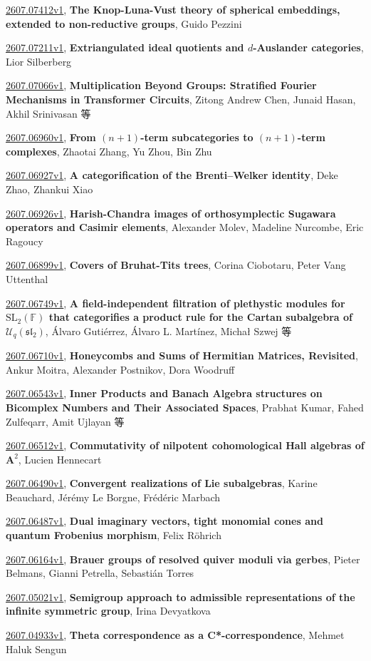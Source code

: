 \documentclass[9pt, a4paper]{article}
\theoremstyle{plain}
\theoremstyle{definition}
\theoremstyle{remark}
\newcommand{\arxiv}[3]{\href{https://arxiv.org/abs/#1}{#1}, \textbf{\textcolor{arxivblue}{#2}}, #3}
\begin{document}
\arxiv{2607.07412v1}{The Knop-Luna-Vust theory of spherical embeddings, extended to non-reductive groups}{Guido Pezzini}

\arxiv{2607.07211v1}{Extriangulated ideal quotients and $d$-Auslander categories}{Lior Silberberg}

\arxiv{2607.07066v1}{Multiplication Beyond Groups: Stratified Fourier Mechanisms in Transformer Circuits}{Zitong Andrew Chen, Junaid Hasan, Akhil Srinivasan 等}

\arxiv{2607.06960v1}{From $(n+1)$-term subcategories to $(n+1)$-term complexes}{Zhaotai Zhang, Yu Zhou, Bin Zhu}

\arxiv{2607.06927v1}{A categorification of the Brenti--Welker identity}{Deke Zhao, Zhankui Xiao}

\arxiv{2607.06926v1}{Harish-Chandra images of orthosymplectic Sugawara operators and Casimir elements}{Alexander Molev, Madeline Nurcombe, Eric Ragoucy}

\arxiv{2607.06899v1}{Covers of Bruhat-Tits trees}{Corina Ciobotaru, Peter Vang Uttenthal}

\arxiv{2607.06749v1}{A field-independent filtration of plethystic modules for $\mathrm{SL}_2(\mathbb{F})$ that categorifies a product rule for the Cartan subalgebra of $\mathcal{U}_q(\mathfrak{sl}_2)$}{Álvaro Gutiérrez, Álvaro L. Martínez, Michał Szwej 等}

\arxiv{2607.06710v1}{Honeycombs and Sums of Hermitian Matrices, Revisited}{Ankur Moitra, Alexander Postnikov, Dora Woodruff}

\arxiv{2607.06543v1}{Inner Products and Banach Algebra structures on Bicomplex Numbers and Their Associated Spaces}{Prabhat Kumar, Fahed Zulfeqarr, Amit Ujlayan 等}

\arxiv{2607.06512v1}{Commutativity of nilpotent cohomological Hall algebras of $\mathbf{A}^2$}{Lucien Hennecart}

\arxiv{2607.06490v1}{Convergent realizations of Lie subalgebras}{Karine Beauchard, Jérémy Le Borgne, Frédéric Marbach}

\arxiv{2607.06487v1}{Dual imaginary vectors, tight monomial cones and quantum Frobenius morphism}{Felix Röhrich}

\arxiv{2607.06164v1}{Brauer groups of resolved quiver moduli via gerbes}{Pieter Belmans, Gianni Petrella, Sebastián Torres}

\arxiv{2607.05021v1}{Semigroup approach to admissible representations of the infinite symmetric group}{Irina Devyatkova}

\arxiv{2607.04933v1}{Theta correspondence as a C*-correspondence}{Mehmet Haluk Sengun}
\end{document}
